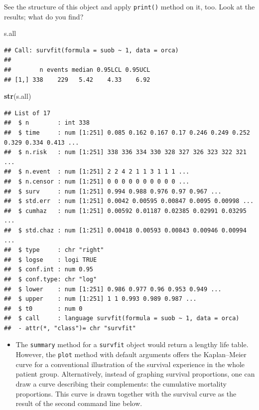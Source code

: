 \documentclass[
]{book}
\newenvironment{Shaded}{\begin{snugshade}}{\end{snugshade}}
\newcommand{\FunctionTok}[1]{\textcolor[rgb]{0.13,0.29,0.53}{\textbf{#1}}}
\newcommand{\NormalTok}[1]{#1}
\providecommand{\tightlist}{%
  \setlength{\itemsep}{0pt}\setlength{\parskip}{0pt}}
\theoremstyle{definition}
\theoremstyle{definition}
\theoremstyle{definition}
\theoremstyle{definition}
\theoremstyle{remark}
\begin{document}
See the structure of this object and apply \texttt{print()} method on it, too.
Look at the results; what do you find?

\begin{Shaded}
\begin{Highlighting}[]
\NormalTok{s.all}
\end{Highlighting}
\end{Shaded}

\begin{verbatim}
## Call: survfit(formula = suob ~ 1, data = orca)
## 
##        n events median 0.95LCL 0.95UCL
## [1,] 338    229   5.42    4.33    6.92
\end{verbatim}

\begin{Shaded}
\begin{Highlighting}[]
\FunctionTok{str}\NormalTok{(s.all)}
\end{Highlighting}
\end{Shaded}

\begin{verbatim}
## List of 17
##  $ n        : int 338
##  $ time     : num [1:251] 0.085 0.162 0.167 0.17 0.246 0.249 0.252 0.329 0.334 0.413 ...
##  $ n.risk   : num [1:251] 338 336 334 330 328 327 326 323 322 321 ...
##  $ n.event  : num [1:251] 2 2 4 2 1 1 3 1 1 1 ...
##  $ n.censor : num [1:251] 0 0 0 0 0 0 0 0 0 0 ...
##  $ surv     : num [1:251] 0.994 0.988 0.976 0.97 0.967 ...
##  $ std.err  : num [1:251] 0.0042 0.00595 0.00847 0.0095 0.00998 ...
##  $ cumhaz   : num [1:251] 0.00592 0.01187 0.02385 0.02991 0.03295 ...
##  $ std.chaz : num [1:251] 0.00418 0.00593 0.00843 0.00946 0.00994 ...
##  $ type     : chr "right"
##  $ logse    : logi TRUE
##  $ conf.int : num 0.95
##  $ conf.type: chr "log"
##  $ lower    : num [1:251] 0.986 0.977 0.96 0.953 0.949 ...
##  $ upper    : num [1:251] 1 1 0.993 0.989 0.987 ...
##  $ t0       : num 0
##  $ call     : language survfit(formula = suob ~ 1, data = orca)
##  - attr(*, "class")= chr "survfit"
\end{verbatim}

\begin{itemize}
\tightlist
\item
  The \texttt{summary} method for a \texttt{survfit} object would return a lengthy
  life table. However, the \texttt{plot} method with default arguments offers
  the Kaplan--Meier curve for a conventional illustration of the
  survival experience in the whole patient group. Alternatively, instead
  of graphing survival proportions, one can draw a curve describing
  their complements: the cumulative mortality proportions. This curve is
  drawn together with the survival curve as the result of the second
  command line below.
\end{itemize}
\end{document}
